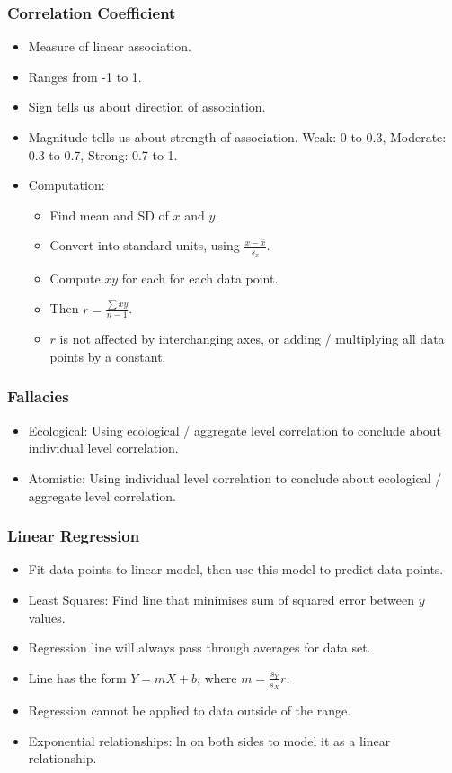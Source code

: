\documentclass[10pt, landscape]{article}
\begin{document}
\begin{multicols*}{3}
\subsubsection{Correlation Coefficient}
\begin{itemize}
    \item Measure of linear association.
    \item Ranges from -1 to 1.
    \item Sign tells us about direction of association.
    \item Magnitude tells us about strength of association. Weak: 0 to 0.3, Moderate: 0.3 to 0.7, Strong: 0.7 to 1.
    \item Computation:
    \begin{itemize}
        \item Find mean and SD of $x$ and $y$.
        \item Convert into standard units, using $\frac{x-\bar{x}}{s_x}$.
        \item Compute $xy$ for each for each data point.
        \item Then $r=\frac{\sum xy}{n-1}$.
        \item $r$ is not affected by interchanging axes, or adding / multiplying all data points by a constant.
    \end{itemize}
\end{itemize}

\subsubsection{Fallacies}
\begin{itemize}
    \item Ecological: Using ecological / aggregate level correlation to conclude about individual level correlation.
    \item Atomistic: Using individual level correlation to conclude about ecological / aggregate level correlation.
\end{itemize}

\subsubsection{Linear Regression}
\begin{itemize}
    \item Fit data points to linear model, then use this model to predict data points.
    \item Least Squares: Find line that minimises sum of squared error between $y$ values.
    \item Regression line will always pass through averages for data set.
    \item Line has the form $Y=mX+b$, where $m=\frac{s_Y}{s_X}r$.
    \item Regression cannot be applied to data outside of the range.
    \item Exponential relationships: ln on both sides to model it as a linear relationship.
\end{itemize}


\end{multicols*}
\end{document}
